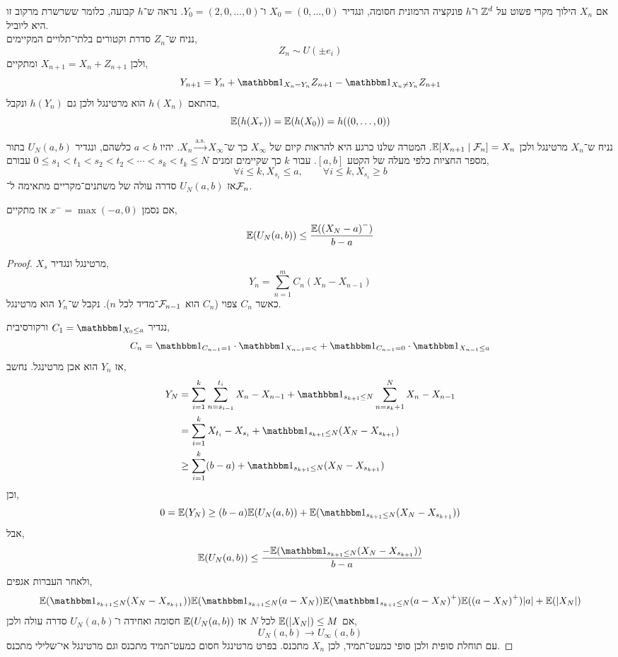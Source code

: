 \begin{example}
	אם $X_n$ הילוך מקרי פשוט על $\mathbb{Z}^d$ ו־$h$ פונקציה הרמונית חסומה,
	ונגדיר $X_0 = (0, \ldots, 0)$ ו־$Y_0 = (2, 0, \ldots, 0)$.
	נראה ש־$h$ קבועה, כלומר ששרשרת מרקוב זו היא ליוביל. \\
	נניח ש־$Z_n$ סדרת וקטורים בלתי־תלויים המקיימים,
	\[
		Z_n
		\sim U(\pm e_i)
	\]
	ולכן $X_{n + 1} = X_n + Z_{n + 1}$ ומתקיים,
	\[
		Y_{n + 1}
		= Y_n + \indicator_{X_n = Y_n} Z_{n + 1} - \indicator_{X_n \ne Y_n} Z_{n + 1}
	\]
	בהתאם $h(X_n)$ הוא מרטינגל ולכן גם $h(Y_n)$ ונקבל,
	\[
		\mathbb{E}(h(X_{\tau}))
		= \mathbb{E}(h(X_0))
		= h((0, \ldots, 0))
	\]
\end{example}
נניח ש־$X_n$ מרטינגל ולכן $\mathbb{E}[X_{n + 1} \mid \mathcal{F}_n] = X_n$.
המטרה שלנו כרגע היא להראות קיום של $X_{\infty}$ כך ש־$X_n \xrightarrow{\text{a.s.}} X_\infty$.
יהיו $a < b$ כלשהם, ונגדיר $U_N(a, b)$ בתור מספר החציות כלפי מעלה של הקטע $[a, b]$.
עבור $k$ כך שקיימים זמנים $0 \le s_1 < t_1 < s_2 < t_2 < \cdots < s_k < t_k \le N$ עבורם,
\[
	\forall i \le k,
	X_{s_i} \le a,
	\qquad
	\forall i \le k,
	X_{s_i} \ge b
\]
אז $U_N(a, b)$ סדרה עולה של משתנים־מקריים מתאימה ל־$\mathcal{F}_n$.
\begin{proposition}
	אם נסמן $x^- = \max(-a, 0)$ אז מתקיים,
	\[
		\mathbb{E}(U_N(a, b))
		\le \frac{\mathbb{E}({(X_N - a)}^-)}{b - a}
	\]
\end{proposition}
\begin{proof}
	$X_s$ מרטינגל ונגדיר,
	\[
		Y_n
		= \sum_{n = 1}^m C_n (X_n - X_{n - 1})
	\]
	כאשר $C_n$ צפוי ($C_n$ הוא $\mathcal{F}_{n - 1}$־מדיד לכל $n$).
	נקבל ש־$Y_n$ הוא מרטינגל.

	נגדיר $C_1 = \indicator_{X_0 \le a}$ ורקורסיבית,
	\[
		C_n
		= \indicator_{C_{n - 1} = 1} \cdot \indicator_{X_{n - 1} = <}
		+ \indicator_{C_{n - 1} = 0} \cdot \indicator_{X_{n - 1} \le a}
	\]
	אז $Y_n$ הוא אכן מרטינגל.
	נחשב,
	\begin{align*}
		Y_N
		& = \sum_{i = 1}^k \sum_{n = s_{i - 1}}^{t_i} X_n - X_{n - 1} + \indicator_{s_{k + 1} \le N} \sum_{n = s_k + 1}^N X_n - X_{n - 1} \\
		& = \sum_{i = 1}^k X_{t_i} - X_{s_i} + \indicator_{s_{k + 1} \le N} (X_N - X_{s_{k + 1}}) \\
		& \ge \sum_{i = 1}^k (b - a) + \indicator_{s_{k + 1} \le N} (X_N - X_{s_{k + 1}})
	\end{align*}
	וכן,
	\[
		0
		= \EE(Y_N)
		\ge (b - a) \EE(U_N(a, b)) + \EE(\indicator_{s_{k + 1} \le N}(X_N - X_{s_{k + 1}}))
	\]
	אבל,
	\[
		\EE(U_N(a, b))
		\le \frac{-\EE(\indicator_{s_{k + 1} \le N}(X_N - X_{s_{k + 1}}))}{b - a}
	\]
	ולאחר העברות אגפים,
	\[
		\EE(\indicator_{s_{k + 1} \le N}(X_N - X_{s_{k + 1}}))
		\EE(\indicator_{s_{k + 1} \le N}(a - X_N))
		\EE(\indicator_{s_{k + 1} \le N}{(a - X_N)}^+)
		\EE({(a - X_N)}^+)
		|a| + \EE(|X_N|)
	\]
	אם $\mathbb{E}(|X_N|) \le M$ לכל $N$ אז $\mathbb{E}(U_N(a, b))$ חסומה ואחידה ו־$U_N(a, b)$ סדרה עולה ולכן,
	\[
		U_N(a, b)
		\to U_{\infty}(a, b)
	\]
	עם תוחלת סופית ולכן סופי כמעט־תמיד, לכן $X_n$ מתכנס.
	בפרט מרטינגל חסום כמעט־תמיד מתכנס וגם מרטינגל אי־שלילי מתכנס.
\end{proof}
